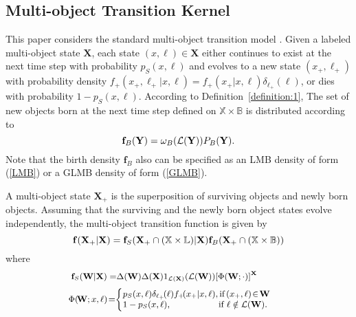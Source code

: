 \documentclass[journal]{IEEEtran}
\newcommand{\bff}{{\mathbf{f}}}
\newcommand{\bY}{{\mathbf Y}}
\newcommand{\bW}{{\mathbf W}}
\newcommand{\bX}{{\mathbf X}}
\begin{document}
\subsection{Multi-object Transition Kernel}
This paper considers the standard multi-object transition model  \cite{refr:Mahler_book,refr:label_1}. Given a labeled multi-object state $\bX$, each state $(x,\ell)\in\bX$ either continues to exist at the next time step with probability $p_S(x,\ell)$ and evolves to a new state $(x_+,\ell_+) $ with probability density $f_+(x_+,\ell_+|x,\ell)=f_{+}(x_+|x,\ell)\delta_{\ell_+}(\ell)$, or dies with probability $1-p_S(x,\ell)$. According to Definition~\ref{definition:1}, The  set of new objects born at  the next time step defined on $\mathbb{X}\times\mathbb{B}$ is distributed according to
\begin{equation}\label{LMO born}
{\small
\bff_{B}(\bY)=\omega_B(\mathcal{L}(\bY))P_B(\bY).}
\end{equation}
Note that  the birth density $\bff_B$ also can be specified as an LMB density of form (\ref{LMB}) or a  GLMB density of form (\ref{GLMB}).


A multi-object state $\bX_+$ is  the superposition of surviving objects and  newly born objects. Assuming that the surviving and the newly born object states evolve independently, the multi-object transition function is given by~\cite{refr:label_2}
\begin{equation}\label{multi-object transition function}
{\small
\bff(\bX_+|\bX)=\bff_S(\bX_+\cap (\mathbb{X\times \mathbb{L}})|\bX)\bff_B(\bX_+\cap(\mathbb{X}\times\mathbb{B}))}
\end{equation} 
where
\begin{equation}
{\small
\begin{split}
\!\!\!\!\!\!\!\!\!\!\!\!\!\bff_S(\bW|\bX)=&\Delta(\bW)\Delta(\bX)1_{\mathcal{L}(\bX)}(\mathcal{L}(\bW)){[\Phi(\bW;\cdot)]}^\bX
\end{split}}
\end{equation} 
\begin{equation}
{\small
\begin{split}
\!\!\Phi(\!\bW;x,\ell)\!=\!&\left\{\begin{array}{l}\!\!\! p_S(x,\ell)\delta_{\ell_+}\!(\ell)f_+\!(x_+|x,\ell),\mbox{if}\, (x_+, \ell)\!\in\! \bW\\
\!\!\!1-p_S(x,\ell), \,\,\,\,\,\,\,\,\,\,\,\,\,\,\,\,\,\,\,\,\,\,\,\,\,\,\,\,\,\,\,\,\mbox{if}\,\,\ell\notin\mathcal{L}(\bW).\end{array}\right.
\end{split}}
\end{equation} 
\end{document}
